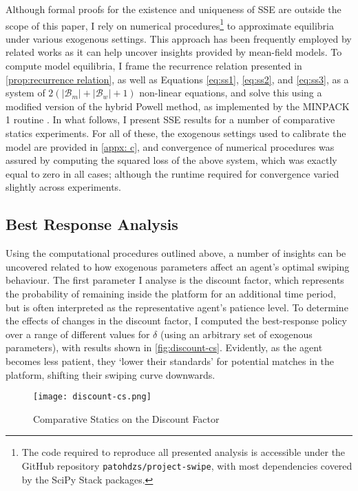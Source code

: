 Although formal proofs for the existence and uniqueness of SSE are outside the scope of this paper, I rely on numerical procedures\footnote{The code required to reproduce all presented analysis is accessible under the GitHub repository \texttt{patohdzs/project-swipe}, with most dependencies covered by the SciPy Stack packages.} to approximate equilibria under various exogenous settings. 
This approach has been frequently employed by related works \citep[see][]{iyer2014mean, gummadi2011optimal} as it can help uncover insights provided by mean-field models. 
To compute model equilibria, I frame the recurrence relation presented in \autoref{prop:recurrence relation}, as well as Equations \ref{eq:ss1}, \ref{eq:ss2}, and \ref{eq:ss3}, as a system of $2(|\mathcal{B}_m|+|\mathcal{B}_w|+1)$ non-linear equations, and solve this using a modified version of the hybrid Powell method, as implemented by the MINPACK 1 routine \citep{more1980user}. 
In what follows, I present SSE results for a number of comparative statics experiments. 
For all of these, the exogenous settings used to calibrate the model are provided in \autoref{appx: c}, and convergence of numerical procedures was assured by computing the squared loss of the above system, which was exactly equal to zero in all cases; although the runtime required for convergence varied slightly across experiments.

\subsection{Best Response Analysis}\label{sec:section3.2} 
Using the computational procedures outlined above, a number of insights can be uncovered related to how exogenous parameters affect an agent's optimal swiping behaviour. 
The first parameter I analyse is the discount factor, which represents the probability of remaining inside the platform for an additional time period, but is often interpreted as the representative agent's patience level.
To determine the effects of changes in the discount factor, I computed the best-response policy over a range of different values for $\delta$ (using an arbitrary set of exogenous parameters), with results shown in \autoref{fig:discount-cs}. 
Evidently, as the agent becomes less patient, they `lower their standards' for potential matches in the platform, shifting their swiping curve downwards. 

\begin{figure}[ht] 
    \centering
    \caption{Comparative Statics on the Discount Factor}
    \texttt{[image: discount-cs.png]}
    \label{fig:discount-cs}
\end{figure} 

